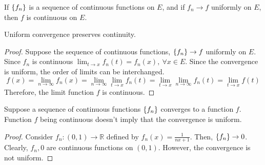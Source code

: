 \begin{theorem} %
	If $\left\{f_n\right\}$ is a sequence of continuous functions on $E$, and if $f_n \to f$ uniformly on $E$, then $f$ is continuous on $E$.
\end{theorem}
\begin{important}
	Uniform convergence preserves continuity.
\end{important}
\begin{proof}
	Suppose the sequence of continuous functions, $\left\{f_n\right\} \to f$ uniformly on $E$.
	Since $f_n$ is continuous $\lim_{t \to x} f_n(t) = f_n(x),\ \forall x \in E$.
	Since the convergence is uniform, the order of limits can be interchanged.
	\[ f(x) = \lim_{n \to \infty} f_n(x) = \lim_{n \to \infty} \lim_{t \to x} f_n(t) = \lim_{t \to x} \lim_{n \to \infty} f_n(t) = \lim_{t \to x} f(t) \]
	Therefore, the limit function $f$ is continuous.
\end{proof}
\begin{remark}
	Suppose a sequence of continuous functions $\left\{f_n\right\}$ converges to a function $f$.
	Function $f$ being continuous doesn't imply that the convergence is uniform.
\end{remark}
\begin{proof}
	Consider $f_n : (0,1) \to \mathbb{R}$ defined by $f_n(x) = \frac{1}{nx+1}$.
	Then, $\left\{f_n\right\} \to 0$.
	Clearly, $f_n,0$ are continuous functions on $(0,1)$.
	However, the convergence is not uniform.
\end{proof}

